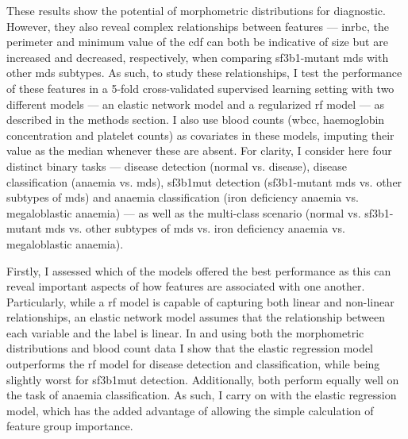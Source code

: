 These results show the potential of morphometric distributions for diagnostic. However, they also reveal complex relationships between features --- in\ac{rbc}, the perimeter and minimum value of the \ac{cdf} can both be indicative of size but are increased and decreased, respectively, when comparing \ac{sf3b1}-mutant \ac{mds} with other \ac{mds} subtypes. As such, to study these relationships, I test the performance of these features in a 5-fold cross-validated supervised learning setting with two different models --- an elastic network model and a regularized \ac{rf} model --- as described in the methods section. I also use blood counts (\ac{wbcc}, haemoglobin concentration and platelet counts) as covariates in these models, imputing their value as the median whenever these are absent. For clarity, I consider here four distinct binary tasks --- disease detection (normal vs. disease), disease classification (anaemia vs. \ac{mds}), \ac{sf3b1}mut detection (\ac{sf3b1}-mutant \ac{mds} vs. other subtypes of \ac{mds}) and anaemia classification (iron deficiency anaemia vs. megaloblastic anaemia) --- as well as the multi-class scenario (normal vs. \ac{sf3b1}-mutant \ac{mds} vs. other subtypes of \ac{mds} vs. iron deficiency anaemia vs. megaloblastic anaemia). 

Firstly, I assessed which of the models offered the best performance as this can reveal important aspects of how features are associated with one another. Particularly, while a \ac{rf} model is capable of capturing both linear and non-linear relationships, an elastic network model assumes that the relationship between each variable and the label is linear. In  and using both the morphometric distributions and blood count data I show that the elastic regression model outperforms the \ac{rf} model for disease detection and classification, while being slightly worst for \ac{sf3b1}mut detection. Additionally, both perform equally well on the task of anaemia classification. As such, I carry on with the elastic regression model, which has the added advantage of allowing the simple calculation of feature group importance.

\begin{figure}[!ht]
    \label{fig:glmnet-vs-rf-auc}
\end{figure}

